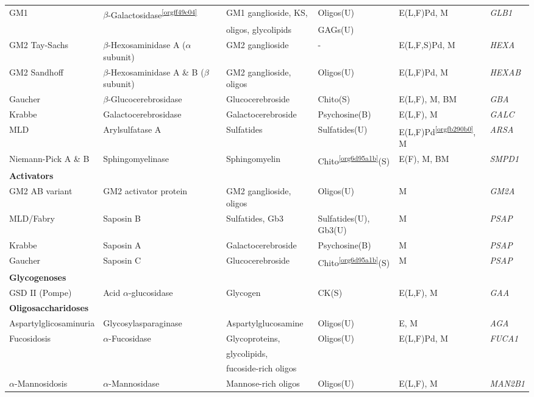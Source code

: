 \documentclass[landscape]{article}
\begin{document}
\begin{longtable}{llllll}
GM1 & \(\beta\)-Galactosidase\textsuperscript{\ref{orgff49c04}} & GM1 ganglioside, KS, & Oligos(U) & E(L,F)Pd, M & \emph{GLB1}\\
 &  & oligos, glycolipids & GAGs(U) &  & \\
GM2 Tay-Sachs & \(\beta\)-Hexosaminidase A (\(\alpha\) subunit) & GM2 ganglioside & - & E(L,F,S)Pd, M & \emph{HEXA}\\
GM2 Sandhoff & \(\beta\)-Hexosaminidase A \& B (\(\beta\) subunit) & GM2 ganglioside, oligos & Oligos(U) & E(L,F)Pd, M & \emph{HEXAB}\\
Gaucher & \(\beta\)-Glucocerebrosidase & Glucocerebroside & Chito\footnotemark(S) & E(L,F), M, BM & \emph{GBA}\\
Krabbe & Galactocerebrosidase & Galactocerebroside & Psychosine(B) & E(L,F), M & \emph{GALC}\\
MLD & Arylsulfatase A & Sulfatides & Sulfatides(U) & E(L,F)Pd\textsuperscript{\ref{orgfb290b0}}, M & \emph{ARSA}\\
Niemann-Pick A \& B & Sphingomyelinase & Sphingomyelin & Chito\textsuperscript{\ref{org6d95a1b}}(S) & E(F), M, BM & \emph{SMPD1}\\
\hline
\textbf{Activators} &  &  &  &  & \\
GM2 AB variant & GM2 activator protein & GM2 ganglioside, oligos & Oligos(U) & M & \emph{GM2A}\\
MLD/Fabry & Saposin B & Sulfatides, Gb3 & Sulfatides(U), Gb3(U) & M & \emph{PSAP}\\
Krabbe & Saposin A & Galactocerebroside & Psychosine(B) & M & \emph{PSAP}\\
Gaucher & Saposin C & Glucocerebroside & Chito\textsuperscript{\ref{org6d95a1b}}(S) & M & \emph{PSAP}\\
\hline
\textbf{Glycogenoses} &  &  &  &  & \\
GSD II (Pompe) & Acid \(\alpha\)-glucosidase & Glycogen & CK(S) & E(L\footnotemark,F), M & \emph{GAA}\\
\hline
\textbf{Oligosaccharidoses} &  &  &  &  & \\
Aspartylglicosaminuria & Glycosylasparaginase & Aspartylglucosamine & Oligos(U) & E, M & \emph{AGA}\\
Fucosidosis & \(\alpha\)-Fucosidase & Glycoproteins, & Oligos(U) & E(L,F)Pd, M & \emph{FUCA1}\\
 &  & glycolipids, &  &  & \\
 &  & fucoside-rich oligos &  &  & \\
\(\alpha\)-Mannosidosis & \(\alpha\)-Mannosidase & Mannose-rich oligos & Oligos(U) & E(L,F), M & \emph{MAN2B1}\\

\end{longtable}
\end{document}
